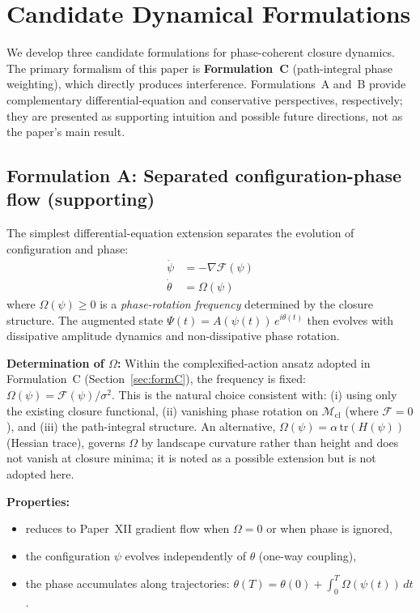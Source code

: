 \documentclass[12pt]{article}
\newcommand{\Mcl}{\mathcal{M}_{\mathrm{cl}}}
\newcommand{\Fcal}{\mathcal{F}}
\begin{document}
\section{Candidate Dynamical Formulations}\label{sec:formulations}

We develop three candidate formulations for phase-coherent closure dynamics. The primary formalism of this paper is \textbf{Formulation~C} (path-integral phase weighting), which directly produces interference. Formulations~A and~B provide complementary differential-equation and conservative perspectives, respectively; they are presented as supporting intuition and possible future directions, not as the paper's main result.

\subsection{Formulation A: Separated configuration-phase flow (supporting)}

The simplest differential-equation extension separates the evolution of configuration and phase:
\begin{align}
    \dot{\psi} &= -\nabla\Fcal(\psi) \label{eq:formApsi} \\
    \dot{\theta} &= \Omega(\psi) \label{eq:formAtheta}
\end{align}
where $\Omega(\psi) \geq 0$ is a \textit{phase-rotation frequency} determined by the closure structure. The augmented state $\Psi(t) = A(\psi(t))\, e^{i\theta(t)}$ then evolves with dissipative amplitude dynamics and non-dissipative phase rotation.

\textbf{Determination of $\Omega$:} Within the complexified-action ansatz adopted in Formulation~C (Section~\ref{sec:formC}), the frequency is fixed: $\Omega(\psi) = \Fcal(\psi)/\sigma^2$. This is the natural choice consistent with: (i) using only the existing closure functional, (ii) vanishing phase rotation on $\Mcl$ (where $\Fcal = 0$), and (iii) the path-integral structure. An alternative, $\Omega(\psi) = \alpha\, \mathrm{tr}(H(\psi))$ (Hessian trace), governs $\Omega$ by landscape curvature rather than height and does not vanish at closure minima; it is noted as a possible extension but is not adopted here.

\textbf{Properties:}
\begin{itemize}
    \item reduces to Paper~XII gradient flow when $\Omega = 0$ or when phase is ignored,
    \item the configuration $\psi$ evolves independently of $\theta$ (one-way coupling),
    \item the phase accumulates along trajectories: $\theta(T) = \theta(0) + \int_0^T \Omega(\psi(t))\, dt$.
\end{itemize}
\end{document}
